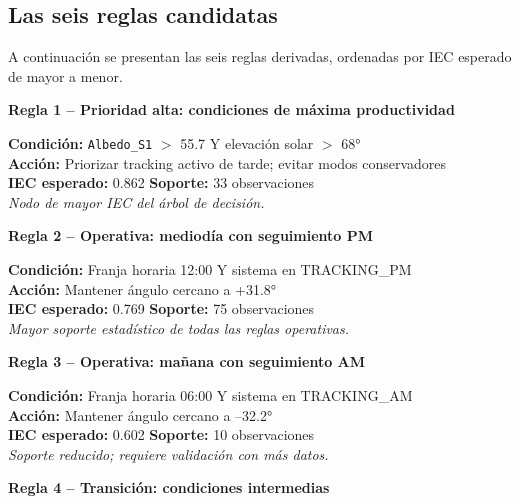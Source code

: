 \documentclass[12pt,a4paper]{article}
\begin{document}
\subsection{Las seis reglas candidatas}

A continuación se presentan las seis reglas derivadas, ordenadas por IEC esperado
de mayor a menor.

\vspace{0.4cm}
\noindent\textbf{Regla 1 -- Prioridad alta: condiciones de máxima productividad}

\begin{reglabox}
\textbf{Condición:} \texttt{Albedo\_S1} $>$ 55.7 Y elevación solar $>$ 68° \\
\textbf{Acción:} Priorizar tracking activo de tarde; evitar modos conservadores \\
\textbf{IEC esperado:} 0.862 \quad \textbf{Soporte:} 33 observaciones \\
\textit{Nodo de mayor IEC del árbol de decisión.}
\end{reglabox}

\vspace{0.3cm}
\noindent\textbf{Regla 2 -- Operativa: mediodía con seguimiento PM}

\begin{reglabox}
\textbf{Condición:} Franja horaria 12:00 Y sistema en TRACKING\_PM \\
\textbf{Acción:} Mantener ángulo cercano a +31.8° \\
\textbf{IEC esperado:} 0.769 \quad \textbf{Soporte:} 75 observaciones \\
\textit{Mayor soporte estadístico de todas las reglas operativas.}
\end{reglabox}

\vspace{0.3cm}
\noindent\textbf{Regla 3 -- Operativa: mañana con seguimiento AM}

\begin{reglabox}
\textbf{Condición:} Franja horaria 06:00 Y sistema en TRACKING\_AM \\
\textbf{Acción:} Mantener ángulo cercano a --32.2° \\
\textbf{IEC esperado:} 0.602 \quad \textbf{Soporte:} 10 observaciones \\
\textit{Soporte reducido; requiere validación con más datos.}
\end{reglabox}

\vspace{0.3cm}
\noindent\textbf{Regla 4 -- Transición: condiciones intermedias}
\end{document}
